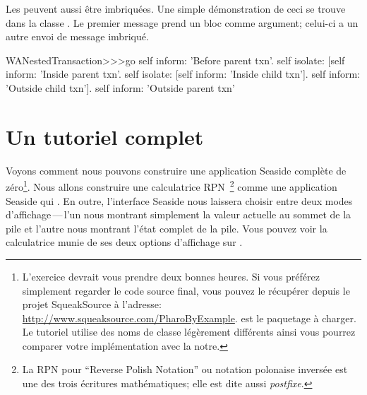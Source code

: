 \documentclass[a4paper,10pt,twoside]{book}
\begin{document}
Les \transactions{} peuvent aussi être imbriquées.
Une simple démonstration de ceci se trouve dans la classe
.
Le premier message  prend un bloc comme argument;
celui-ci a un autre envoi de message  imbriqué.

\begin{code}{}
WANestedTransaction>>>go
	self inform: 'Before parent txn'.
	self isolate:
			[self inform: 'Inside parent txn'.
			self isolate: [self inform: 'Inside child txn'].
			self inform: 'Outside child txn'].
	self inform: 'Outside parent txn'
\end{code}


\section{Un tutoriel complet}


Voyons comment nous pouvons construire une application Seaside
complète de zéro\footnote{L'exercice devrait vous prendre deux bonnes
  heures. Si vous préférez simplement regarder le code source final,
  vous pouvez le récupérer depuis le projet SqueakSource à l'adresse:
 \url{http://www.squeaksource.com/PharoByExample}. 
 est le paquetage à charger. Le tutoriel utilise des noms de classe
 légèrement différents ainsi vous pourrez comparer votre
 implémentation avec la notre.%
}.
Nous allons construire une calculatrice RPN~\footnote{La RPN pour
  ``Reverse Polish Notation'' ou notation polonaise inversée est une
  des trois écritures mathématiques; elle est dite aussi
  \emph{postfixe}.} %
comme une application Seaside qui .
En outre, l'interface Seaside nous laissera choisir entre deux modes
d'affichage\,---\,l'un nous montrant simplement la valeur
actuelle au sommet de la pile et l'autre nous montrant l'état complet
de la pile.
Vous pouvez voir la calculatrice munie de ses deux options d'affichage
sur .
\end{document}
